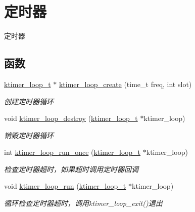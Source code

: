 \hypertarget{a00139}{}\section{定时器}
\label{a00139}


定时器  


\subsection*{函数}
\begin{DoxyCompactItemize}
\item 
\hyperlink{a00066_a024af2aa29615e7a811ea6c45438157d_a024af2aa29615e7a811ea6c45438157d}{ktimer\+\_\+loop\+\_\+t} $\ast$ \hyperlink{a00139_gaef96e7c368db456236a2121e3d75c49c_gaef96e7c368db456236a2121e3d75c49c}{ktimer\+\_\+loop\+\_\+create} (time\+\_\+t freq, int slot)
\begin{DoxyCompactList}\small\item\em 创建定时器循环 \end{DoxyCompactList}\item 
void \hyperlink{a00139_gad3dafe93f5b45424bd5983ef0c163687_gad3dafe93f5b45424bd5983ef0c163687}{ktimer\+\_\+loop\+\_\+destroy} (\hyperlink{a00066_a024af2aa29615e7a811ea6c45438157d_a024af2aa29615e7a811ea6c45438157d}{ktimer\+\_\+loop\+\_\+t} $\ast$ktimer\+\_\+loop)
\begin{DoxyCompactList}\small\item\em 销毁定时器循环 \end{DoxyCompactList}\item 
int \hyperlink{a00139_gaf195cf4006bced494e99242c36ad36c0_gaf195cf4006bced494e99242c36ad36c0}{ktimer\+\_\+loop\+\_\+run\+\_\+once} (\hyperlink{a00066_a024af2aa29615e7a811ea6c45438157d_a024af2aa29615e7a811ea6c45438157d}{ktimer\+\_\+loop\+\_\+t} $\ast$ktimer\+\_\+loop)
\begin{DoxyCompactList}\small\item\em 检查定时器超时，如果超时调用定时器回调 \end{DoxyCompactList}\item 
void \hyperlink{a00139_ga5e31b2fc26af005e97b09804c5a98099_ga5e31b2fc26af005e97b09804c5a98099}{ktimer\+\_\+loop\+\_\+run} (\hyperlink{a00066_a024af2aa29615e7a811ea6c45438157d_a024af2aa29615e7a811ea6c45438157d}{ktimer\+\_\+loop\+\_\+t} $\ast$ktimer\+\_\+loop)
\begin{DoxyCompactList}\small\item\em 循环检查定时器超时，调用ktimer\+\_\+loop\+\_\+exit()退出 \end{DoxyCompactList}\item 

\end{DoxyCompactItemize}
